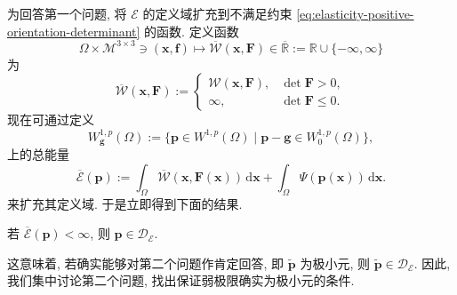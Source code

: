 为回答第一个问题, 将 $\mathcal{E}$ 的定义域扩充到不满足约束 \eqref{eq:elasticity-positive-orientation-determinant} 的函数. 定义函数
\begin{equation}\label{eq:elasticity-extended-stored-density-mapping}
\Omega\times\mathcal{M}^{3\times3}\ni(\bm{x},\bm{f})\mapsto\overline{\mathcal{W}}(\bm{x},\bm{F})\in\overline{\mathbb{R}}:=\mathbb{R}\cup\{-\infty,\infty\}
\end{equation}
为
\begin{equation}\label{eq:elasticity-extended-density-by-determinant}
\overline{\mathcal{W}}(\bm{x},\bm{F}):=\begin{cases}\mathcal{W}(\bm{x},\bm{F}),&\det\bm{F}>0,\\\infty,&\det\bm{F}\leq0.\end{cases}
\end{equation}
现在可通过定义
\begin{equation}\label{eq:elasticity-extended-sobolev-affine-domain}
W_{\bm{g}}^{1,p}(\Omega):=\{\bm{p}\in W^{1,p}(\Omega)\mid\bm{p}-\bm{g}\in W_0^{1,p}(\Omega)\},
\end{equation}
上的总能量
\begin{equation}\label{eq:elasticity-extended-total-energy-functional}
\overline{\mathcal{E}}(\bm{p}):=\int_\Omega\overline{\mathcal{W}}(\bm{x},\bm{F}(\bm{x}))\,\mathrm{d}\bm{x}+\int_\Omega\Psi(\bm{p}(\bm{x}))\,\mathrm{d}\bm{x}.
\end{equation}
来扩充其定义域. 于是立即得到下面的结果.

\begin{Lemma}
\label{lem:elasticity-finite-extended-energy-admissibility}
若 $\overline{\mathcal{E}}(\bm{p})<\infty$, 则 $\bm{p}\in\mathcal{D}_{\mathcal{E}}$.
\end{Lemma}

这意味着, 若确实能够对第二个问题作肯定回答, 即 $\widetilde{\bm{p}}$ 为极小元, 则 $\widetilde{\bm{p}}\in\mathcal{D}_{\mathcal{E}}$. 因此, 我们集中讨论第二个问题, 找出保证弱极限确实为极小元的条件.

